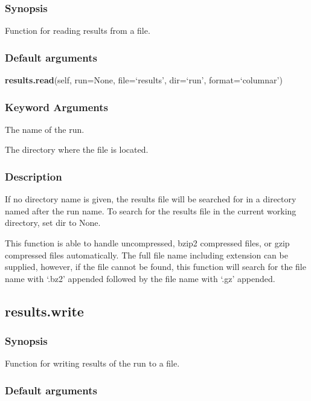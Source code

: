 \subsubsection{Synopsis}

Function for reading results from a file.

\subsubsection{Default arguments}

\textsf{\textbf{results.read}(self, run=None, file=`results', dir=`run', format=`columnar')}


\subsubsection{Keyword Arguments}

  The name of the run.

  The directory where the file is located.

\subsubsection{Description}

If no directory name is given, the results file will be searched for in a directory named
after the run name.  To search for the results file in the current working directory, set
dir to None.

This function is able to handle uncompressed, bzip2 compressed files, or gzip compressed
files automatically.  The full file name including extension can be supplied, however, if
the file cannot be found, this function will search for the file name with `.bz2' appended
followed by the file name with `.gz' appended.


\newpage

\subsection{results.write}


\subsubsection{Synopsis}

Function for writing results of the run to a file.

\subsubsection{Default arguments}


